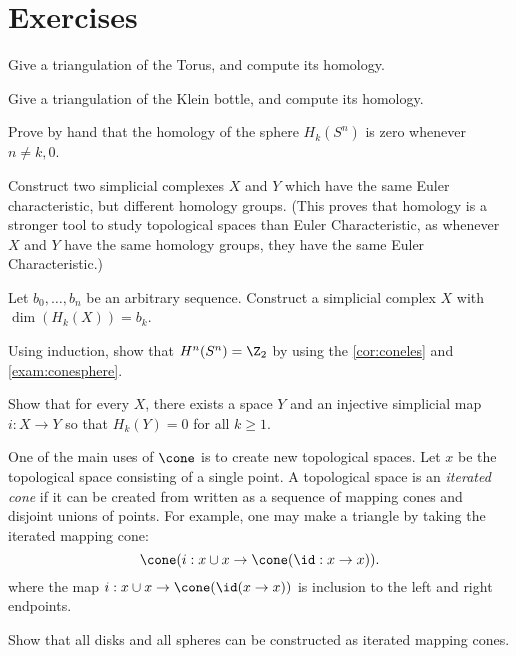 


\section{Exercises}


\begin{exercise}\label{exer:simp:homtorus}
Give a triangulation of the Torus, and compute its homology.
\end{exercise}

\begin{exercise}\label{exer:simp:homklein}
Give a triangulation of the Klein bottle, and compute its homology. 
\end{exercise}

\begin{exercise}\label{exer:simp:spherebyhand}
Prove by hand that the homology of the sphere $H_k(S^n)$ is zero whenever $n\neq k, 0$. 
\end{exercise}

\begin{exercise}\label{exer:simp:homologystronger}
Construct two simplicial complexes $X$ and $Y$ which have the same Euler characteristic, but different homology groups. (This proves that homology is a stronger tool to study topological spaces than Euler Characteristic, as whenever $X$ and $Y$ have the same homology groups, they have the same Euler Characteristic.)
\end{exercise}

\begin{exercise}\label{exer:simp:arbitraryhom}
Let $b_0, \ldots, b_n$ be an arbitrary sequence. Construct a simplicial complex $X$ with $\dim(H_k(X))=b_k$. 
\end{exercise}



\begin{exercise}
\label{exer:homsphere}
Using induction, show that $H^n(S^n)=\Z_2$ by using the \ref{cor:coneles} and \ref{exam:conesphere}.
\end{exercise}

\begin{exercise}\label{exer:hom:conecontract}
Show that for every $X$, there exists a space $Y$ and an injective simplicial map $i: X\to Y$ so that $H_k(Y)=0$ for all $k\geq 1$. 
\end{exercise}

One of the main uses of $\cone$ is to create new topological spaces. Let $x$ be the topological space consisting of a single point. A topological space is an \emph{iterated cone} if it can be created from written as a sequence of mapping cones and disjoint unions of points. For example, one may make a triangle by taking the iterated mapping cone:
\[\cone(i:x\cup x \to  \cone(\id:x\to x)).\]
where the map $i:x\cup x\to \cone(\id(x\to x))$ is inclusion to the left and right endpoints. 
\begin{exercise}\label{exer:hom:iteratedmapping}
Show that all disks and all spheres can be constructed as iterated mapping cones. 
\end{exercise}

